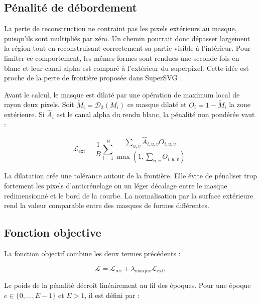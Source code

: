 \documentclass[12pt, a4paper, oneside]{report}
\begin{document}
\subsection{Pénalité de débordement}

La perte de reconstruction ne contraint pas les pixels extérieurs au masque, puisqu'ils sont multipliés par zéro. Un chemin pourrait donc dépasser largement la région tout en reconstruisant correctement sa partie visible à l'intérieur. Pour limiter ce comportement, les mêmes formes sont rendues une seconde fois en blanc et leur canal alpha est comparé à l'extérieur du superpixel. Cette idée est proche de la perte de frontière proposée dans SuperSVG \cite{hu2024supersvg}.

Avant le calcul, le masque est dilaté par une opération de maximum local de rayon deux pixels. Soit $\widetilde{M}_i=\mathcal{D}_2(M_i)$ ce masque dilaté et $O_i=1-\widetilde{M}_i$ la zone extérieure. Si $\widehat{A}_i$ est le canal alpha du rendu blanc, la pénalité non pondérée vaut :

\begin{equation}
    \mathcal{L}_{\mathrm{ext}} =
    \frac{1}{B}\sum_{i=1}^{B}
    \frac{\displaystyle\sum_{u,v}\widehat{A}_{i,u,v}O_{i,u,v}}
         {\displaystyle\max\!\left(1,\sum_{u,v}O_{i,u,v}\right)}.
    \label{eq:perte_debordement_approche}
\end{equation}

La dilatation crée une tolérance autour de la frontière. Elle évite de pénaliser trop fortement les pixels d'anticrénelage ou un léger décalage entre le masque redimensionné et le bord de la courbe. La normalisation par la surface extérieure rend la valeur comparable entre des masques de formes différentes.

\subsection{Fonction objective}

La fonction objectif combine les deux termes précédents :

\begin{equation}
    \mathcal{L} = \mathcal{L}_{\mathrm{rec}}
    + \lambda_{\mathrm{masque}}\mathcal{L}_{\mathrm{ext}}.
    \label{eq:objectif_global_approche}
\end{equation}

Le poids de la pénalité décroît linéairement au fil des époques. Pour une époque $e \in \{0,\ldots,E-1\}$ et $E>1$, il est défini par :
\end{document}
